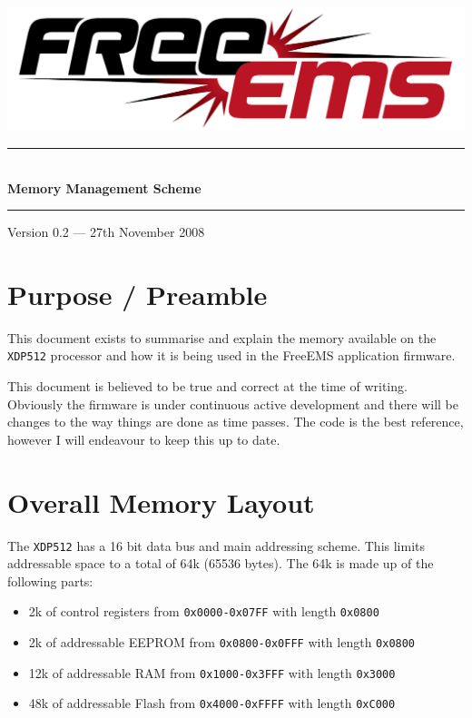 \documentclass[12pt,a4paper,titlepage]{article}
\newcommand{\HRule}{\rule{\linewidth}{0.5mm}}
\begin{document}
\begin{titlepage} 
\begin{center}

\includegraphics[width=1\textwidth]{./logos/freeems}\\[1cm] \vfill

\HRule \\[0.8cm]
{ \huge \bfseries Memory Management Scheme}\\[0.4cm]
\HRule \vfill

\Large 

{\large Version 0.2 --- 27th November 2008}

\end{center}
\end{titlepage} 


\tableofcontents
\thispagestyle{empty}
\pagebreak


\section {Purpose / Preamble} 

This document exists to summarise and explain the memory available on the
\texttt{XDP512} processor and how it is being used in the FreeEMS application
firmware.

This document is believed to be true and correct at the time of writing.
Obviously the firmware is under continuous active development and there will
be changes to the way things are done as time passes. The code is the best
reference, however I will endeavour to keep this up to date.


\section{Overall Memory Layout}

The \texttt{XDP512} has a 16 bit data bus and main addressing scheme. This
limits addressable space to a total of 64k (65536 bytes). The 64k is made up of
the following parts:

\begin{itemize}
\item 2k of control registers from \texttt{0x0000-0x07FF} with 
length \texttt{0x0800}

\item 2k of addressable EEPROM from \texttt{0x0800-0x0FFF} with
length \texttt{0x0800}

\item 12k of addressable RAM from \texttt{0x1000-0x3FFF} with
length \texttt{0x3000}

\item 48k of addressable Flash from \texttt{0x4000-0xFFFF} with
length \texttt{0xC000}
\end{itemize}
\end{document}
